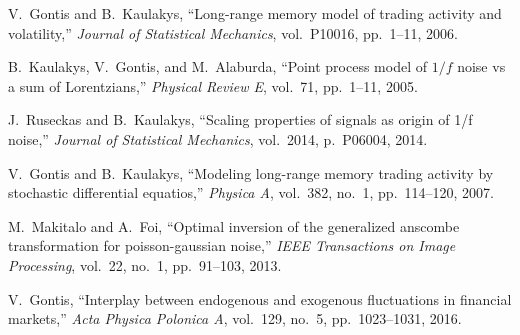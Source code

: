 \documentclass{article}
\begin{document}
\begin{thebibliography}{10}
V.~Gontis and B.~Kaulakys, ``Long-range memory model of trading activity and
  volatility,'' {\em Journal of Statistical Mechanics}, vol.~P10016, pp.~1--11,
  2006.

B.~Kaulakys, V.~Gontis, and M.~Alaburda, ``Point process model of $1/f$ noise
  vs a sum of {L}orentzians,'' {\em Physical Review E}, vol.~71, pp.~1--11,
  2005.

J.~Ruseckas and B.~Kaulakys, ``Scaling properties of signals as origin of 1/f
  noise,'' {\em Journal of Statistical Mechanics}, vol.~2014, p.~P06004, 2014.

V.~Gontis and B.~Kaulakys, ``Modeling long-range memory trading activity by
  stochastic differential equatios,'' {\em Physica A}, vol.~382, no.~1,
  pp.~114--120, 2007.

M.~Makitalo and A.~Foi, ``Optimal inversion of the generalized anscombe
  transformation for poisson-gaussian noise,'' {\em IEEE Transactions on Image
  Processing}, vol.~22, no.~1, pp.~91--103, 2013.

V.~Gontis, ``Interplay between endogenous and exogenous fluctuations in
  financial markets,'' {\em Acta Physica Polonica A}, vol.~129, no.~5,
  pp.~1023--1031, 2016.

\end{thebibliography}
\end{document}
